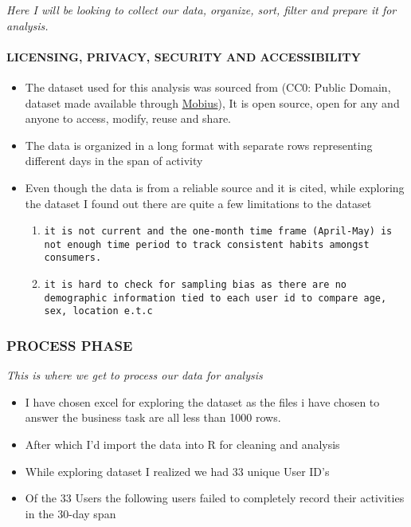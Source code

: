 \documentclass[
]{article}
\providecommand{\tightlist}{%
  \setlength{\itemsep}{0pt}\setlength{\parskip}{0pt}}
\begin{document}
\emph{Here I will be looking to collect our data, organize, sort, filter
and prepare it for analysis.}

\hypertarget{licensing-privacy-security-and-accessibility}{%
\paragraph{LICENSING, PRIVACY, SECURITY AND
ACCESSIBILITY}\label{licensing-privacy-security-and-accessibility}}

\begin{itemize}
\tightlist
\item
  The dataset used for this analysis was sourced from (CC0: Public
  Domain, dataset made available through
  \href{https://www.kaggle.com/arashnic}{Mobius}), It is open source,
  open for any and anyone to access, modify, reuse and share.
\item
  The data is organized in a long format with separate rows representing
  different days in the span of activity
\item
  Even though the data is from a reliable source and it is cited, while
  exploring the dataset I found out there are quite a few limitations to
  the dataset

  \begin{enumerate}
  \def\labelenumi{\arabic{enumi}.}
  \item
\begin{verbatim}
it is not current and the one-month time frame (April-May) is not enough time period to track consistent habits amongst consumers.
\end{verbatim}
  \item
\begin{verbatim}
it is hard to check for sampling bias as there are no demographic information tied to each user id to compare age, sex, location e.t.c
\end{verbatim}
  \end{enumerate}
\end{itemize}

\hypertarget{process-phase}{%
\subsubsection{PROCESS PHASE}\label{process-phase}}

\emph{This is where we get to process our data for analysis}

\begin{itemize}
\tightlist
\item
  I have chosen excel for exploring the dataset as the files i have
  chosen to answer the business task are all less than 1000 rows.
\item
  After which I'd import the data into R for cleaning and analysis
\item
  While exploring dataset I realized we had 33 unique User ID's
\item
  Of the 33 Users the following users failed to completely record their
  activities in the 30-day span
\end{itemize}
\end{document}
